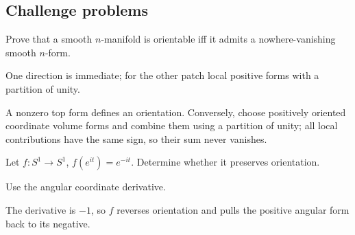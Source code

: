 \subsection*{Challenge problems}

\begin{exercise}\label{exr:vii10-ped-15}
Prove that a smooth \(n\)-manifold is orientable iff it admits a nowhere-vanishing smooth \(n\)-form.
\end{exercise}
\begin{hint}
One direction is immediate; for the other patch local positive forms with a partition of unity.
\end{hint}
\begin{solution}
A nonzero top form defines an orientation.  Conversely, choose positively oriented coordinate volume forms and combine them using a partition of unity; all local contributions have the same sign, so their sum never vanishes.
\end{solution}

\begin{exercise}\label{exr:vii10-ped-16}
Let \(f:S^1\to S^1\), \(f(e^{it})=e^{-it}\).  Determine whether it preserves orientation.
\end{exercise}
\begin{hint}
Use the angular coordinate derivative.
\end{hint}
\begin{solution}
The derivative is \(-1\), so \(f\) reverses orientation and pulls the positive angular form back to its negative.
\end{solution}

